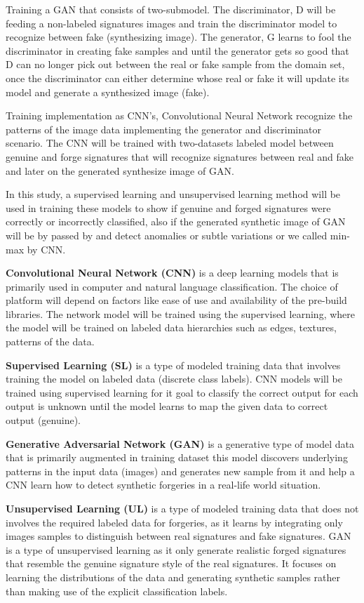 \documentclass[12pt]{article}
\begin{document}
Training a GAN that consists of two-submodel. The discriminator, D will be feeding a non-labeled signatures images and train the discriminator model to recognize between fake (synthesizing image). The generator, G learns to fool the discriminator in creating fake samples and until the generator gets so good that D can no longer pick out between the real or fake sample from the domain set, once the discriminator can either determine whose real or fake it will update its model and generate a synthesized image (fake).

Training implementation as CNN’s, Convolutional Neural Network recognize the patterns of the image data implementing the generator and discriminator scenario. The CNN will be trained with two-datasets labeled model between genuine and forge signatures that will recognize signatures between real and fake and later on the generated synthesize image of GAN.

In this study, a supervised learning and unsupervised learning method will be used in training these models to show if genuine and forged signatures were correctly or incorrectly classified, also if the generated synthetic image of GAN will be by passed by and detect anomalies or subtle variations or we called min-max by CNN. 

\textbf{Convolutional Neural Network (CNN)} is a deep learning models that is primarily used in computer and natural language classification. The choice of platform will depend on factors like ease of use and availability of the pre-build libraries. The network model will be trained using the supervised learning, where the model will be trained on labeled data hierarchies such as edges, textures, patterns of the data.

\textbf{Supervised Learning (SL)} is a type of modeled training data that involves training the model on labeled data (discrete class labels). CNN models will be trained using supervised learning for it goal to classify the correct output for each output is unknown until the model learns to map the given data to correct output (genuine).

\textbf{Generative Adversarial Network (GAN)} is a generative type of model data that is primarily augmented in training dataset this model discovers underlying patterns in the input data (images) and generates new sample from it and help a CNN learn how to detect synthetic forgeries in a real-life world situation.

\textbf{Unsupervised Learning (UL)} is a type of modeled training data that does not involves the required labeled data for forgeries, as it learns by integrating only images samples to distinguish between real signatures and fake signatures. GAN is a type of unsupervised learning as it only generate realistic forged signatures that resemble the genuine signature style of the real signatures. It focuses on learning the distributions of the data and generating synthetic samples rather than making use of the explicit classification labels.
\end{document}
